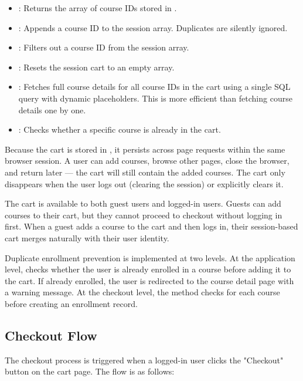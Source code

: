 \documentclass[12pt,a4paper]{report}
\begin{document}
\begin{itemize}
    \item {}: Returns the array of course IDs stored in .
    \item {}: Appends a course ID to the session array. Duplicates are silently ignored.
    \item {}: Filters out a course ID from the session array.
    \item {}: Resets the session cart to an empty array.
    \item {}: Fetches full course details for all course IDs in the cart using a single SQL  query with dynamic placeholders. This is more efficient than fetching course details one by one.
    \item {}: Checks whether a specific course is already in the cart.
\end{itemize}

Because the cart is stored in , it persists across page requests within the same browser session. A user can add courses, browse other pages, close the browser, and return later — the cart will still contain the added courses. The cart only disappears when the user logs out (clearing the session) or explicitly clears it.

The cart is available to both guest users and logged-in users. Guests can add courses to their cart, but they cannot proceed to checkout without logging in first. When a guest adds a course to the cart and then logs in, their session-based cart merges naturally with their user identity.

Duplicate enrollment prevention is implemented at two levels. At the application level,  checks whether the user is already enrolled in a course before adding it to the cart. If already enrolled, the user is redirected to the course detail page with a warning message. At the checkout level, the  method checks  for each course before creating an enrollment record.

\subsection{Checkout Flow}

The checkout process is triggered when a logged-in user clicks the "Checkout" button on the cart page. The flow is as follows:
\end{document}

